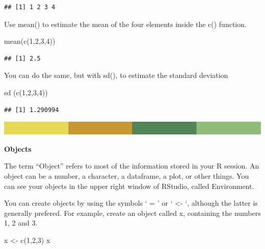 \documentclass[
]{book}
\newenvironment{Shaded}{\begin{snugshade}}{\end{snugshade}}
\newcommand{\DecValTok}[1]{\textcolor[rgb]{0.00,0.00,0.81}{#1}}
\newcommand{\FunctionTok}[1]{\textcolor[rgb]{0.00,0.00,0.00}{#1}}
\newcommand{\NormalTok}[1]{#1}
\newcommand{\OtherTok}[1]{\textcolor[rgb]{0.56,0.35,0.01}{#1}}
\begin{document}
\begin{verbatim}
## [1] 1 2 3 4
\end{verbatim}

Use mean() to estimate the mean of the four elements inside the c() function.

\begin{Shaded}
\begin{Highlighting}[]
\FunctionTok{mean}\NormalTok{(}\FunctionTok{c}\NormalTok{(}\DecValTok{1}\NormalTok{,}\DecValTok{2}\NormalTok{,}\DecValTok{3}\NormalTok{,}\DecValTok{4}\NormalTok{))}
\end{Highlighting}
\end{Shaded}

\begin{verbatim}
## [1] 2.5
\end{verbatim}

You can do the same, but with sd(), to estimate the standard deviation

\begin{Shaded}
\begin{Highlighting}[]
\FunctionTok{sd}\NormalTok{ (}\FunctionTok{c}\NormalTok{(}\DecValTok{1}\NormalTok{,}\DecValTok{2}\NormalTok{,}\DecValTok{3}\NormalTok{,}\DecValTok{4}\NormalTok{))}
\end{Highlighting}
\end{Shaded}

\begin{verbatim}
## [1] 1.290994
\end{verbatim}

\includegraphics{rsrstrip.png}

\textbf{Objects}

The term ``Object'' refers to most of the information stored in your R session. An object can be a number, a character, a dataframe, a plot, or other things. You can see your objects in the upper right window of RStudio, called Environment.

You can create objects by using the symbols ` = ' or ` \textless- `, although the latter is generally prefered. For example, create an object called x, containing the numbers 1, 2 and 3.

\begin{Shaded}
\begin{Highlighting}[]
\NormalTok{x }\OtherTok{\textless{}{-}} \FunctionTok{c}\NormalTok{(}\DecValTok{1}\NormalTok{,}\DecValTok{2}\NormalTok{,}\DecValTok{3}\NormalTok{)}
\NormalTok{x}
\end{Highlighting}
\end{Shaded}
\end{document}
